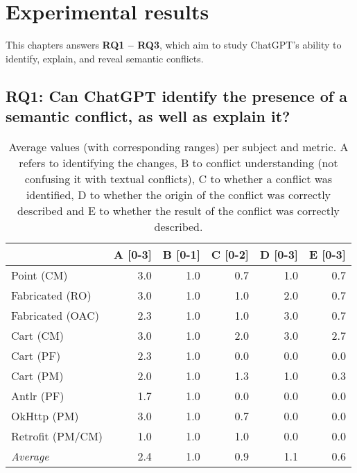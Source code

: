 \chapter{Experimental results}\label{chap:results}

This chapters answers \textbf{RQ1 -- RQ3}, which aim to study ChatGPT's ability to identify, explain, and reveal semantic conflicts. %

\section{RQ1: Can ChatGPT identify the presence of a semantic conflict, as well as explain it?}\label{sec:results:rq1}

\begin{table}[t]
\centering
\begin{tabular}{@{\extracolsep{\fill}} lrrrrr} \toprule
                 & A [0-3] & B [0-1] & C [0-2] & D [0-3] & E [0-3] \\
\midrule
Point (CM)       & 3.0 & 1.0 & 0.7 & 1.0 & 0.7 \\
Fabricated (RO)  & 3.0 & 1.0 & 1.0 & 2.0 & 0.7 \\
Fabricated (OAC) & 2.3 & 1.0 & 1.0 & 3.0 & 0.7 \\
Cart (CM)        & 3.0 & 1.0 & 2.0 & 3.0 & 2.7 \\
Cart (PF)        & 2.3 & 1.0 & 0.0 & 0.0 & 0.0 \\
Cart (PM)        & 2.0 & 1.0 & 1.3 & 1.0 & 0.3 \\
Antlr (PF)       & 1.7 & 1.0 & 0.0 & 0.0 & 0.0 \\
OkHttp (PM)      & 3.0 & 1.0 & 0.7 & 0.0 & 0.0 \\
Retrofit (PM/CM) & 1.0 & 1.0 & 1.0 & 0.0 & 0.0 \\
\midrule
\textit{Average}  & 2.4 & 1.0 & 0.9 & 1.1 & 0.6 \\
\bottomrule
\end{tabular}
\caption{Average values (with corresponding ranges) per subject and metric.
A refers to identifying the changes, B to conflict understanding (not confusing it with textual conflicts),
C to whether a conflict was identified, D to whether the origin of the conflict was correctly described and
E to whether the result of the conflict was correctly described.
\label{tab:results:rq1}}
\end{table}

